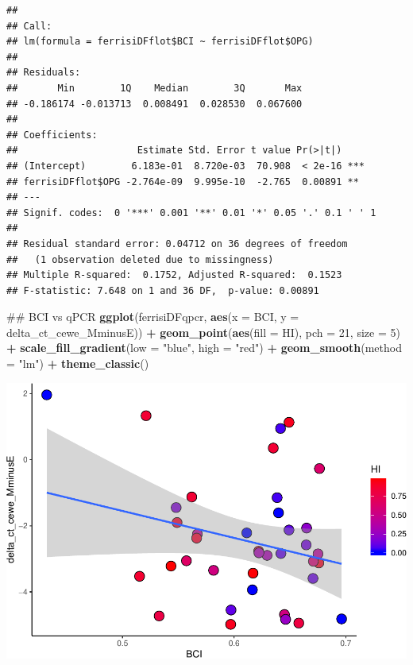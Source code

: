 \documentclass[]{article}
\newenvironment{Shaded}{\begin{snugshade}}{\end{snugshade}}
\newcommand{\KeywordTok}[1]{\textcolor[rgb]{0.13,0.29,0.53}{\textbf{#1}}}
\newcommand{\DataTypeTok}[1]{\textcolor[rgb]{0.13,0.29,0.53}{#1}}
\newcommand{\DecValTok}[1]{\textcolor[rgb]{0.00,0.00,0.81}{#1}}
\newcommand{\StringTok}[1]{\textcolor[rgb]{0.31,0.60,0.02}{#1}}
\newcommand{\OperatorTok}[1]{\textcolor[rgb]{0.81,0.36,0.00}{\textbf{#1}}}
\newcommand{\NormalTok}[1]{#1}
\begin{document}
\begin{Shaded}
\end{Shaded}

\begin{verbatim}
## 
## Call:
## lm(formula = ferrisiDFflot$BCI ~ ferrisiDFflot$OPG)
## 
## Residuals:
##       Min        1Q    Median        3Q       Max 
## -0.186174 -0.013713  0.008491  0.028530  0.067600 
## 
## Coefficients:
##                     Estimate Std. Error t value Pr(>|t|)    
## (Intercept)        6.183e-01  8.720e-03  70.908  < 2e-16 ***
## ferrisiDFflot$OPG -2.764e-09  9.995e-10  -2.765  0.00891 ** 
## ---
## Signif. codes:  0 '***' 0.001 '**' 0.01 '*' 0.05 '.' 0.1 ' ' 1
## 
## Residual standard error: 0.04712 on 36 degrees of freedom
##   (1 observation deleted due to missingness)
## Multiple R-squared:  0.1752, Adjusted R-squared:  0.1523 
## F-statistic: 7.648 on 1 and 36 DF,  p-value: 0.00891
\end{verbatim}

\begin{Shaded}
\begin{Highlighting}[]
\NormalTok{## BCI vs qPCR}
\KeywordTok{ggplot}\NormalTok{(ferrisiDFqpcr, }
       \KeywordTok{aes}\NormalTok{(}\DataTypeTok{x =}\NormalTok{ BCI, }\DataTypeTok{y =}\NormalTok{ delta_ct_cewe_MminusE)) }\OperatorTok{+}
\StringTok{  }\KeywordTok{geom_point}\NormalTok{(}\KeywordTok{aes}\NormalTok{(}\DataTypeTok{fill =}\NormalTok{ HI), }\DataTypeTok{pch =} \DecValTok{21}\NormalTok{, }\DataTypeTok{size =} \DecValTok{5}\NormalTok{) }\OperatorTok{+}
\StringTok{  }\KeywordTok{scale_fill_gradient}\NormalTok{(}\DataTypeTok{low =} \StringTok{"blue"}\NormalTok{, }\DataTypeTok{high =} \StringTok{"red"}\NormalTok{) }\OperatorTok{+}
\StringTok{  }\KeywordTok{geom_smooth}\NormalTok{(}\DataTypeTok{method =} \StringTok{"lm"}\NormalTok{) }\OperatorTok{+}
\StringTok{  }\KeywordTok{theme_classic}\NormalTok{()}
\end{Highlighting}
\end{Shaded}

\includegraphics{Data_Analysis_Alice_files/figure-latex/unnamed-chunk-1-5.pdf}
\end{document}

